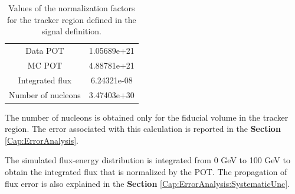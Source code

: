 \begin{table}[!h]
    \centering
    \begin{tabular}{c|c}
        Data POT & 1.05689e+21 \\
        MC POT & 4.88781e+21 \\
        Integrated flux & 6.24321e-08 \\
        Number of nucleons & 3.47403e+30
    \end{tabular}
    \caption{Values of the normalization factors for the tracker region defined in the signal definition.}
    \label{tab:my_label}
\end{table}

The number of nucleons is obtained only for the fiducial volume in the tracker region. The error associated with this calculation is reported in the \textbf{Section} \ref{Cap:ErrorAnalysis}.

The simulated flux-energy distribution is integrated from 0 GeV to 100 GeV to obtain the integrated flux that is normalized by the POT. The propagation of flux error is also explained in the \textbf{Section} \ref{Cap:ErrorAnalysis:SystematicUnc}.







